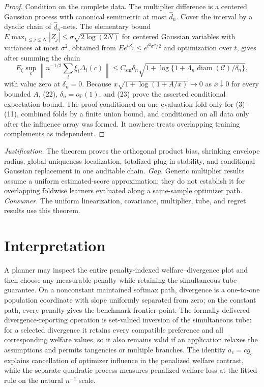 \documentclass{article}
\begin{document}
\begin{proof}
Condition on the complete data. The multiplier difference is a centered Gaussian process with canonical semimetric at most \(\widehat d_n\). Cover the interval by a dyadic chain of \(\widehat d_n\)-nets. The elementary bound \(E\max_{1\leq j\leq N}|Z_j|\leq\sigma\sqrt{2\log(2N)}\) for centered Gaussian variables with variances at most \(\sigma^2\), obtained from \(E e^{tZ_j}\leq e^{t^2\sigma^2/2}\) and optimization over \(t\), gives after summing the chain
\[
 E_\xi\sup_c\left\|n^{-1/2}\sum_i\xi_i\Delta_i(c)\right\|
 \leq C_{\mathrm{sm}}\delta_n
 \sqrt{1+\log\{1+\Lambda_n\operatorname{diam}(\mathcal C)/\delta_n\}},
 \tag{23}
\]
with value zero at \(\delta_n=0\). Because \(x\sqrt{1+\log(1+A/x)}\to0\) as \(x\downarrow0\) for every bounded \(A\), (22), \(\delta_n=o_{\mathbb P}(1)\), and (23) prove the asserted conditional expectation bound. The proof conditioned on one evaluation fold only for (3)--(11), combined folds by a finite union bound, and conditioned on all data only after the influence array was formed. It nowhere treats overlapping training complements as independent.
\end{proof}
\par\smallskip\noindent \textit{Justification.} The theorem proves the orthogonal product bias, shrinking envelope radius, global-uniqueness localization, totalized plug-in stability, and conditional Gaussian replacement in one auditable chain. \textit{Gap.} Generic multiplier results assume a uniform estimated-score approximation; they do not establish it for overlapping foldwise learners evaluated along a same-sample optimizer path. \textit{Consumer.} The uniform linearization, covariance, multiplier, tube, and regret results use this theorem.

\section{Interpretation}

A planner may inspect the entire penalty-indexed welfare--divergence plot and then choose any measurable penalty while retaining the simultaneous tube guarantee. On a nonconstant maintained softmax path, divergence is a one-to-one population coordinate with slope uniformly separated from zero; on the constant path, every penalty gives the benchmark frontier point. The formally delivered divergence-reporting operation is set-valued inversion of the simultaneous tube: for a selected divergence it retains every compatible preference and all corresponding welfare values, so it also remains valid if an application relaxes the assumptions and permits tangencies or multiple branches. The identity \(a_c=cg_c\) explains cancellation of optimizer influence in the penalized welfare contrast, while the separate quadratic process measures penalized-welfare loss at the fitted rule on the natural \(n^{-1}\) scale.
\end{document}
